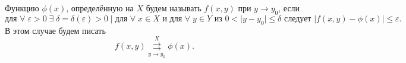 \begin{col-answer-preambule}
	Функцию $\phi(x)$, определённую на $X$ будем называть  $f(x,y)$ при $y \to y_0$, если
	\begin{equation}
	\label{eq:lecture04-04}
	\text{для } \forall \; \varepsilon > 0 \; \exists \; \delta = \delta (\varepsilon) > 0 \; | \; \text{для } \forall \; x \in X \text{ и для } \forall \; y \in Y \text{ из } 0 < |y-y_0| \leqslant \delta \text{ следует } |f(x,y) - \phi(x)| \leqslant \varepsilon.
	\end{equation}
	В этом случае будем писать
	\begin{equation}
	\label{eq:lecture04-05}
	f(x,y) \overset{X}{\underset{y \to y_0}{\rightrightarrows}} \phi(x).
	\end{equation}
\end{col-answer-preambule}

